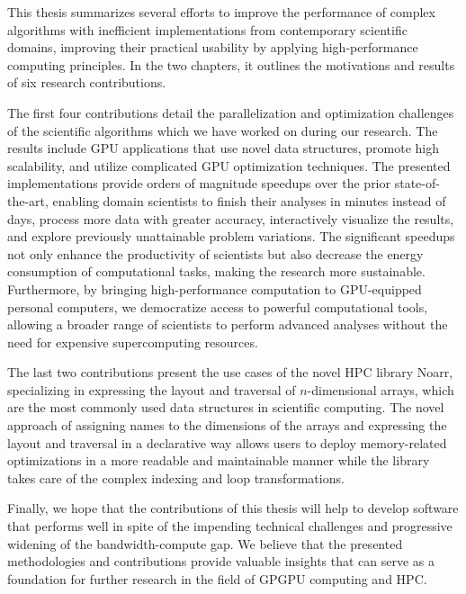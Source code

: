 
This thesis summarizes several efforts to improve the performance of complex algorithms with inefficient implementations from contemporary scientific domains, improving their practical usability by applying high-performance computing principles. In the two chapters, it outlines the motivations and results of six research contributions.

The first four contributions detail the parallelization and optimization challenges of the scientific algorithms which we have worked on during our research. The results include GPU applications that use novel data structures, promote high scalability, and utilize complicated GPU optimization techniques. The presented implementations provide orders of magnitude speedups over the prior state-of-the-art, enabling domain scientists to finish their analyses in minutes instead of days, process more data with greater accuracy, interactively visualize the results, and explore previously unattainable problem variations. The significant speedups not only enhance the productivity of scientists but also decrease the energy consumption of computational tasks, making the research more sustainable. Furthermore, by bringing high-performance computation to GPU-equipped personal computers, we democratize access to powerful computational tools, allowing a broader range of scientists to perform advanced analyses without the need for expensive supercomputing resources.

The last two contributions present the use cases of the novel HPC library Noarr, specializing in expressing the layout and traversal of $n$-dimensional arrays, which are the most commonly used data structures in scientific computing. The novel approach of assigning names to the dimensions of the arrays and expressing the layout and traversal in a declarative way allows users to deploy memory-related optimizations in a more readable and maintainable manner while the library takes care of the complex indexing and loop transformations.

Finally, we hope that the contributions of this thesis will help to develop software that performs well in spite of the impending technical challenges and progressive widening of the bandwidth-compute gap. We believe that the presented methodologies and contributions provide valuable insights that can serve as a foundation for further research in the field of GPGPU computing and HPC.

